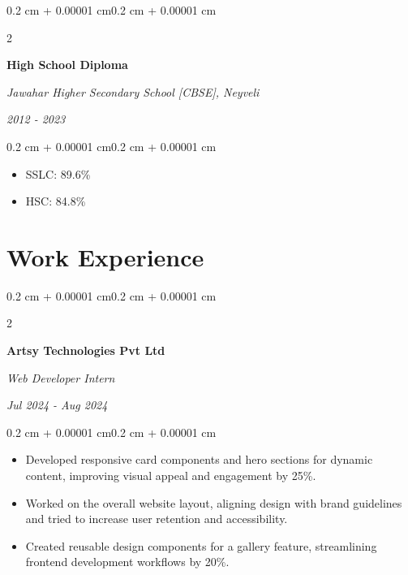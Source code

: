 \documentclass[10pt, letterpaper]{article}
\newenvironment{highlights}{
    \begin{itemize}[topsep=0.10 cm, parsep=0.10 cm, partopsep=0pt, itemsep=0pt, leftmargin=0.4 cm + 10pt]
}{
    \end{itemize}
}
\newenvironment{onecolentry}{
    \begin{adjustwidth}{0.2 cm + 0.00001 cm}{0.2 cm + 0.00001 cm}
}{
    \end{adjustwidth}
}
\newenvironment{twocolentry}[2][]{
    \onecolentry
    \def\secondColumn{#2}
    \setcolumnwidth{\fill, 4.5 cm}
    \begin{paracol}{2}
}{
    \switchcolumn \raggedleft \secondColumn
    \end{paracol}
    \endonecolentry
}
\begin{document}
        \vspace{0.2 cm}
        \begin{twocolentry}{
            \textit{2012 - 2023}}
            \textbf{High School Diploma}

            \textit{Jawahar Higher Secondary School [CBSE], Neyveli}
        \end{twocolentry}
        \vspace{0.10 cm}
        \begin{onecolentry}
            \begin{highlights}
                \item SSLC: 89.6\%
                \item HSC: 84.8\%
            \end{highlights}
        \end{onecolentry}

    \section{Work Experience}
        \begin{twocolentry}{
            \textit{Jul 2024 - Aug 2024}}
            \textbf{Artsy Technologies Pvt Ltd}

            \textit{Web Developer Intern}
        \end{twocolentry}
        \vspace{0.10 cm}
        \begin{onecolentry}
            \begin{highlights}
                \item Developed responsive card components and hero sections for dynamic content, improving visual appeal and engagement by 25\%.
                \item Worked on the overall website layout, aligning design with brand guidelines and tried to increase user retention and accessibility.
                \item Created reusable design components for a gallery feature, streamlining frontend development workflows by 20\%.
            \end{highlights}
        \end{onecolentry}
        
\end{document}

